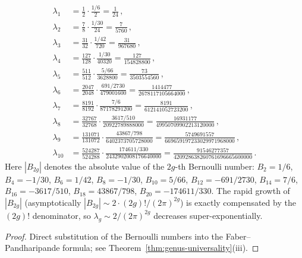 \begin{proposition}
\label{prop:fp-coefficients}
\begin{align}
\lambda_1 &= \tfrac{1}{2} \cdot \tfrac{1/6}{2}
  = \tfrac{1}{24}\,,
  \label{eq:lambda1} \\
\lambda_2 &= \tfrac{7}{8} \cdot \tfrac{1/30}{24}
  = \tfrac{7}{5760}\,,
  \label{eq:lambda2} \\
\lambda_3 &= \tfrac{31}{32} \cdot \tfrac{1/42}{720}
  = \tfrac{31}{967680}\,,
  \label{eq:lambda3} \\
\lambda_4 &= \tfrac{127}{128} \cdot \tfrac{1/30}{40320}
  = \tfrac{127}{154828800}\,,
  \label{eq:lambda4} \\
\lambda_5 &= \tfrac{511}{512} \cdot \tfrac{5/66}{3628800}
  = \tfrac{73}{3503554560}\,,
  \label{eq:lambda5} \\
\lambda_6 &= \tfrac{2047}{2048} \cdot \tfrac{691/2730}{479001600}
  = \tfrac{1414477}{2678117105664000}\,,
  \label{eq:lambda6} \\
\lambda_7 &= \tfrac{8191}{8192} \cdot \tfrac{7/6}{87178291200}
  = \tfrac{8191}{612141052723200}\,,
  \label{eq:lambda7} \\
\lambda_8 &= \tfrac{32767}{32768} \cdot \tfrac{3617/510}{20922789888000}
  = \tfrac{16931177}{49950709902213120000}\,,
  \label{eq:lambda8} \\
\lambda_9 &= \tfrac{131071}{131072} \cdot \tfrac{43867/798}{6402373705728000}
  = \tfrac{5749691557}{669659197233029971968000}\,,
  \label{eq:lambda9} \\
\lambda_{10} &= \tfrac{524287}{524288} \cdot \tfrac{174611/330}{2432902008176640000}
  = \tfrac{91546277357}{420928638260761696665600000}\,.
  \label{eq:lambda10}
\end{align}
Here $|B_{2g}|$ denotes the absolute value of the $2g$-th
Bernoulli number: $B_2 = 1/6$, $B_4 = -1/30$, $B_6 = 1/42$,
$B_8 = -1/30$, $B_{10} = 5/66$, $B_{12} = -691/2730$,
$B_{14} = 7/6$, $B_{16} = -3617/510$, $B_{18} = 43867/798$,
$B_{20} = -174611/330$.
The rapid growth of $|B_{2g}|$ (asymptotically
$|B_{2g}| \sim 2 \cdot (2g)! / (2\pi)^{2g}$) is exactly
compensated by the $(2g)!$ denominator, so
$\lambda_g \sim 2/(2\pi)^{2g}$ decreases super-exponentially.
\end{proposition}

\begin{proof}
Direct substitution of the Bernoulli numbers into the
Faber--Pandharipande formula; see
Theorem~\ref{thm:genus-universality}(iii).
\end{proof}

